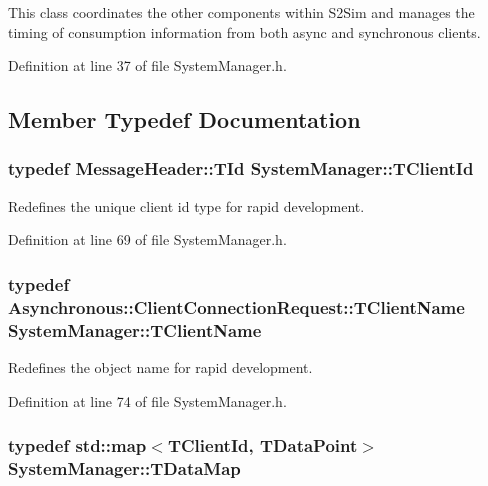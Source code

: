 This class coordinates the other components within S2\-Sim and manages the timing of consumption information from both async and synchronous clients. 

Definition at line 37 of file System\-Manager.\-h.



\subsection{Member Typedef Documentation}
\hypertarget{class_system_manager_af957fc0ff78c4c38085c26ac0d81064e}{
\subsubsection[{T\-Client\-Id}]{\setlength{\rightskip}{0pt plus 5cm}typedef {\bf Message\-Header\-::\-T\-Id} {\bf System\-Manager\-::\-T\-Client\-Id}}}\label{class_system_manager_af957fc0ff78c4c38085c26ac0d81064e}


Redefines the unique client id type for rapid development. 



Definition at line 69 of file System\-Manager.\-h.

\hypertarget{class_system_manager_a2d2818eaeb5787ef4f4d009ff343d195}{
\subsubsection[{T\-Client\-Name}]{\setlength{\rightskip}{0pt plus 5cm}typedef {\bf Asynchronous\-::\-Client\-Connection\-Request\-::\-T\-Client\-Name} {\bf System\-Manager\-::\-T\-Client\-Name}}}\label{class_system_manager_a2d2818eaeb5787ef4f4d009ff343d195}


Redefines the object name for rapid development. 



Definition at line 74 of file System\-Manager.\-h.

\hypertarget{class_system_manager_ac003793cd03c1af317bf30b11e8c0a5a}{
\subsubsection[{T\-Data\-Map}]{\setlength{\rightskip}{0pt plus 5cm}typedef std\-::map$<${\bf T\-Client\-Id}, {\bf T\-Data\-Point}$>$ {\bf System\-Manager\-::\-T\-Data\-Map}\hspace{0.3cm}{\ttfamily [private]}}}\label{class_system_manager_ac003793cd03c1af317bf30b11e8c0a5a}


